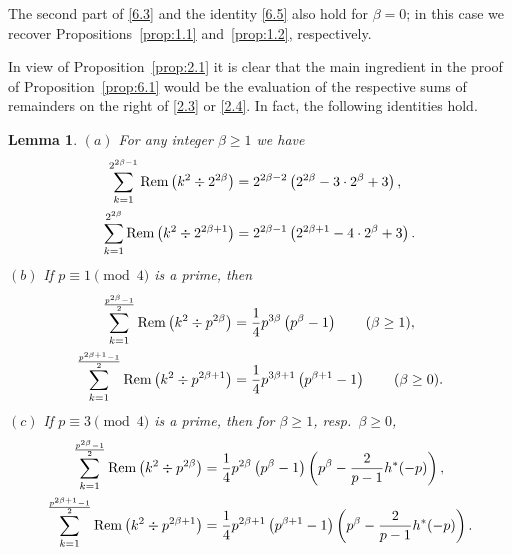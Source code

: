 \documentclass{amsart}
\theoremstyle{plain}
\newtheorem{lemma}[theorem]{Lemma}
\numberwithin{equation}{section}
\begin{document}
The second part of \eqref{6.3} and the identity \eqref{6.5} also hold for
$\beta=0$; in this case we recover Propositions~\ref{prop:1.1} 
and~\ref{prop:1.2}, respectively.

In view of Proposition~\ref{prop:2.1} it is clear that the main ingredient
in the proof of Proposition~\ref{prop:6.1} would be the evaluation of the 
respective sums of remainders on the right of \eqref{2.3} or \eqref{2.4}. 
In fact, the following identities hold.

\begin{lemma}\label{lem:6.2}
$(a)$ For any integer $\beta\geq 1$ we have
\begin{align}
\sum_{k=1}^{2^{2\beta-1}}{\rm Rem}\left(k^2\div 2^{2\beta}\right)
&= 2^{2\beta-2}\left(2^{2\beta}-3\cdot 2^{\beta}+3\right),\label{6.6}\\
\sum_{k=1}^{2^{2\beta}}{\rm Rem}\left(k^2\div 2^{2\beta+1}\right)
&= 2^{2\beta-1}\left(2^{2\beta+1}-4\cdot 2^{\beta}+3\right).\label{6.7}
\end{align}
$(b)$ If $p\equiv 1\pmod{4}$ is a prime, then
\begin{align}
\sum_{k=1}^{\frac{p^{2\beta}-1}{2}}{\rm Rem}\left(k^2\div p^{2\beta}\right)
&=\frac{1}{4}p^{3\beta}\left(p^{\beta}-1\right)\qquad(\beta\geq 1),\label{6.8}\\
\sum_{k=1}^{\frac{p^{2\beta+1}-1}{2}}{\rm Rem}\left(k^2\div p^{2\beta+1}\right)
&=\frac{1}{4}p^{3\beta+1}\left(p^{\beta+1}-1\right)\qquad(\beta\geq 0).\label{6.9}
\end{align}
$(c)$ If $p\equiv 3\pmod{4}$ is a prime, then for $\beta\geq 1$, resp.\
$\beta\geq 0$,
\begin{align}
\sum_{k=1}^{\frac{p^{2\beta}-1}{2}}{\rm Rem}\left(k^2\div p^{2\beta}\right)
&=\frac{1}{4}p^{2\beta}\left(p^{\beta}-1\right)
\left(p^{\beta}-\frac{2}{p-1}h^*(-p)\right),\label{6.10}\\
\sum_{k=1}^{\frac{p^{2\beta+1}-1}{2}}{\rm Rem}\left(k^2\div p^{2\beta+1}\right)
&=\frac{1}{4}p^{2\beta+1}\left(p^{\beta+1}-1\right)
\left(p^{\beta}-\frac{2}{p-1}h^*(-p)\right).\label{6.11}
\end{align}
\end{lemma}

\end{document}
